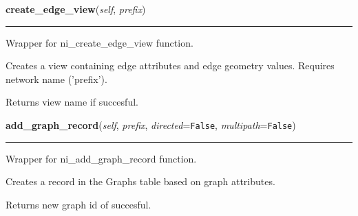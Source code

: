     \label{nx_pgnet:nisql:create_edge_view}

    \vspace{0.5ex}

\hspace{.8\funcindent}\begin{boxedminipage}{\funcwidth}

    \raggedright \textbf{create\_edge\_view}(\textit{self}, \textit{prefix})

    \vspace{-1.5ex}

    \rule{\textwidth}{0.5\fboxrule}
\setlength{\parskip}{2ex}
    Wrapper for ni\_create\_edge\_view function.

    Creates a view containing edge attributes and edge geometry values. 
    Requires network name ('prefix').

    Returns view name if succesful.

\setlength{\parskip}{1ex}
    \end{boxedminipage}

    \label{nx_pgnet:nisql:add_graph_record}

    \vspace{0.5ex}

\hspace{.8\funcindent}\begin{boxedminipage}{\funcwidth}

    \raggedright \textbf{add\_graph\_record}(\textit{self}, \textit{prefix}, \textit{directed}={\tt False}, \textit{multipath}={\tt False})

    \vspace{-1.5ex}

    \rule{\textwidth}{0.5\fboxrule}
\setlength{\parskip}{2ex}
    Wrapper for ni\_add\_graph\_record function.

    Creates a record in the Graphs table based on graph attributes.

    Returns new graph id of succesful.

\setlength{\parskip}{1ex}
    \end{boxedminipage}

    \label{nx_pgnet:nisql:node_geometry_equaility_check}

